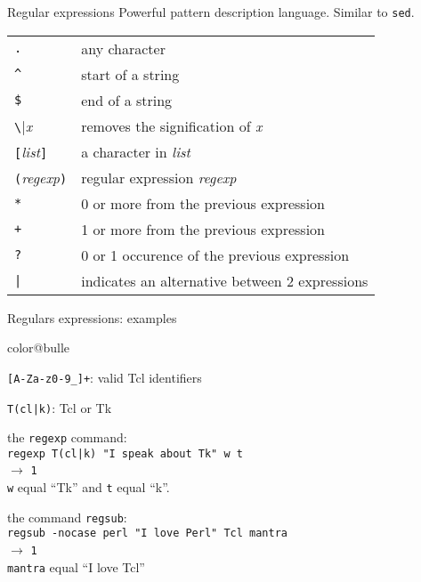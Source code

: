 \documentclass[a4paper,landscape,smooth]{show}
\newcommand{\tclex}[2]{\texttt{#1}\\$\rightarrow$ \texttt{#2}}
\begin{document}
\begin{tslide}{Regular expressions}
   \vfill
   Powerful pattern description language. Similar to \texttt{sed}.\\

   \vfill
   \begin{tabular}{ll}
      \verb|.| & any character \\
      \verb|^| & start of a string \\
      \verb|$| & end of a string \\ %
      \verb|\|\emph{x} & removes the signification of \emph{x} \\
      \verb|[|\emph{list}\verb|]| & a character in \emph{list} \\
      \verb|(|\emph{regexp}\verb|)| & regular expression \emph{regexp} \\
      \verb|*| & 0 or more from the previous expression \\
      \verb|+| & 1 or more from the previous expression \\
      \verb|?| & 0 or 1 occurence of the previous expression \\
      \verb:|: & indicates an alternative between 2 expressions \\
   \end{tabular}
   \vfill
\end{tslide}


\begin{tslide}{Regulars expressions: examples}
   \vfill
   \begin{bitemize}{color@bulle}
      \item \verb|[A-Za-z0-9_]+|: valid Tcl identifiers
      \item \verb:T(cl|k):: Tcl or Tk
      \item the \texttt{regexp} command: \\
	\tclex{regexp T(cl|k) "I speak about Tk" w t}{1}\\
	\texttt{w} equal ``Tk'' and \texttt{t} equal ``k''. 
      \item the command \texttt{regsub}: \\
	\tclex{regsub -nocase perl "I love Perl" Tcl mantra}{1}\\
	\texttt{mantra} equal ``I love Tcl''
   \end{bitemize}
   \vfill
\end{tslide}

\end{document}

